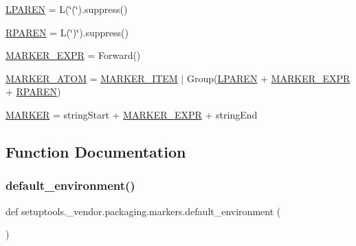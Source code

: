 \begin{DoxyCompactItemize}
\item 
\hyperlink{namespacesetuptools_1_1__vendor_1_1packaging_1_1markers_a3ebc8206e3652278c8b679f53f63b808}{L\+P\+A\+R\+EN} = L(\char`\"{}(\char`\"{}).suppress()
\item 
\hyperlink{namespacesetuptools_1_1__vendor_1_1packaging_1_1markers_a7931171c32f82d5b17dd05dbd6898ae1}{R\+P\+A\+R\+EN} = L(\char`\"{})\char`\"{}).suppress()
\item 
\hyperlink{namespacesetuptools_1_1__vendor_1_1packaging_1_1markers_ab9cab017631765e5f92c71c6e9a7040d}{M\+A\+R\+K\+E\+R\+\_\+\+E\+X\+PR} = Forward()
\item 
\hyperlink{namespacesetuptools_1_1__vendor_1_1packaging_1_1markers_a61c041105dd50e8df4fa82ca8a24e165}{M\+A\+R\+K\+E\+R\+\_\+\+A\+T\+OM} = \hyperlink{namespacesetuptools_1_1__vendor_1_1packaging_1_1markers_a09f5a22d9147ab9be7a6fbd993a28025}{M\+A\+R\+K\+E\+R\+\_\+\+I\+T\+EM} $\vert$ Group(\hyperlink{namespacesetuptools_1_1__vendor_1_1packaging_1_1markers_a3ebc8206e3652278c8b679f53f63b808}{L\+P\+A\+R\+EN} + \hyperlink{namespacesetuptools_1_1__vendor_1_1packaging_1_1markers_ab9cab017631765e5f92c71c6e9a7040d}{M\+A\+R\+K\+E\+R\+\_\+\+E\+X\+PR} + \hyperlink{namespacesetuptools_1_1__vendor_1_1packaging_1_1markers_a7931171c32f82d5b17dd05dbd6898ae1}{R\+P\+A\+R\+EN})
\item 
\hyperlink{namespacesetuptools_1_1__vendor_1_1packaging_1_1markers_a30885a40c7f427ed3d9e48578dbd1a9e}{M\+A\+R\+K\+ER} = string\+Start + \hyperlink{namespacesetuptools_1_1__vendor_1_1packaging_1_1markers_ab9cab017631765e5f92c71c6e9a7040d}{M\+A\+R\+K\+E\+R\+\_\+\+E\+X\+PR} + string\+End
\end{DoxyCompactItemize}


\subsection{Function Documentation}
\mbox{\label{namespacesetuptools_1_1__vendor_1_1packaging_1_1markers_a9fa619979508af28a6c53b0b61c3ae15}} 
\subsubsection{\texorpdfstring{default\+\_\+environment()}{default\_environment()}}
{\footnotesize\ttfamily def setuptools.\+\_\+vendor.\+packaging.\+markers.\+default\+\_\+environment (\begin{DoxyParamCaption}{ }\end{DoxyParamCaption})}

